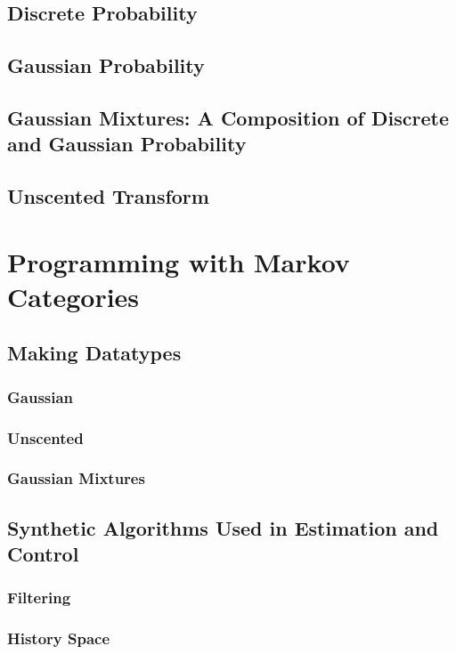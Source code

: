 \section{Discrete Probability}
\section{Gaussian Probability}
\section{Gaussian Mixtures: A Composition of Discrete and Gaussian Probability}
\section{Unscented Transform}

\chapter{Programming with Markov Categories}
\section{Making Datatypes}
\subsection{Gaussian}
\subsection{Unscented}
\subsection{Gaussian Mixtures}

\section{Synthetic Algorithms Used in Estimation and Control}
\subsection{Filtering}
\subsection{History Space}

